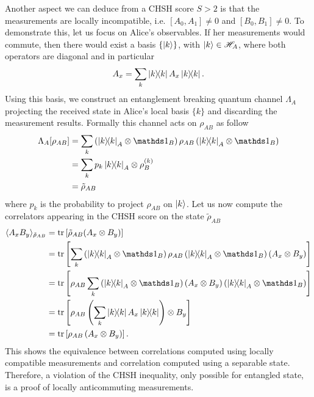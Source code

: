 Another aspect we can deduce from a CHSH score $S>2$ is that the measurements are locally incompatible, i.e. $[A_0,A_1] \neq 0$ and $[B_0,B_1] \neq 0$.
To demonstrate this, let us focus on Alice's observables. 
If her measurements would commute, then there would exist a basis $\{\ket{k}\}$, with $\ket{k}\in \mathscr{H}_A$, where both operators are diagonal and in particular
\begin{equation}
	\begin{split}
		A_x = \sum_k \ketbra{k} A_x \ketbra{k}.
	\end{split}	
\end{equation}
Using this basis, we construct an entanglement breaking quantum channel $\Lambda_A$ projecting the received state in Alice's local basis $\{k\}$ and discarding the measurement results. 
Formally this channel acts on $\rho_{AB}$ as follow
\begin{equation}
	\begin{split}
		\Lambda_A[\rho_{AB}] &= \sum_k \left(\ketbra{k}_A \otimes \id_B \right)\rho_{AB}	\left(\ketbra{k}_A \otimes \id_B \right) \\
							 &= \sum_k p_k \ketbra{k}_A \otimes \rho_B^{(k)} \\
							 &= \tilde{\rho}_{AB} 
	\end{split}
\end{equation}
where $p_k$ is the probability to project $\rho_{AB}$ on $\ket{k}$.
Let us now compute the correlators appearing in the CHSH score on the state $\tilde{\rho}_{AB}$
\begin{equation}
	\begin{split}
		\mean{A_x B_y}_{\tilde{\rho}_{AB}} &= \trr{\tilde{\rho}_{AB}(A_x \otimes B_y)} \\
										   &=\trr{\sum_k \left(\ketbra{k}_A \otimes \id_B \right)\rho_{AB}	\left(\ketbra{k}_A \otimes \id_B \right) \left(A_x \otimes B_y\right) } \\
					   &= \trr{\rho_{AB} \sum_k \left(\ketbra{k}_A \otimes \id_B \right)\left(A_x \otimes B_y\right)\left(\ketbra{k}_A \otimes \id_B \right)  } \\	
					   &= \trr{\rho_{AB}\left(\sum_k \ketbra{k}A_x \ketbra{k}\right) \otimes B_y} \\
					   &= \trr{\rho_{AB}\left(A_x \otimes B_y\right)}.
	\end{split}
	\label{eq:compatible_separable}
\end{equation}
This shows the equivalence between correlations computed using locally compatible measurements and correlation computed using a separable state.
Therefore, a violation of the CHSH inequality, only possible for entangled state, is a proof of locally anticommuting measurements.


